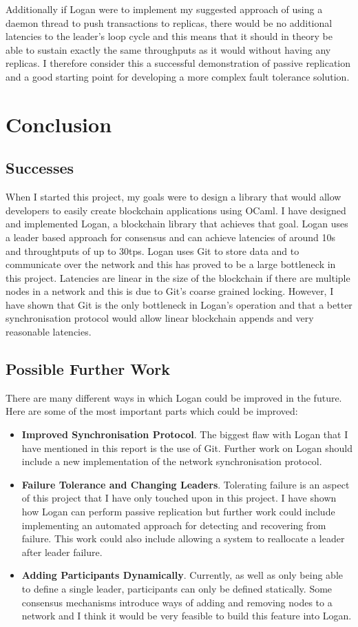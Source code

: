 \documentclass[12pt,a4paper,twoside,openright]{report}
\begin{document}
	Additionally if Logan were to implement my suggested approach of using a daemon thread to push transactions to replicas, there would be no additional latencies to the leader's loop cycle and this means that it should in theory be able to sustain exactly the same throughputs as it would without having any replicas.
	I therefore consider this a successful demonstration of passive replication and a good starting point for developing a more complex fault tolerance solution.

	\chapter{Conclusion}
	\section{Successes}
	When I started this project, my goals were to design a library that would allow developers to easily create blockchain applications using OCaml.
	I have designed and implemented Logan, a blockchain library that achieves that goal.
	Logan uses a leader based approach for consensus and can achieve latencies of around 10s and throughtputs of up to 30tps.
	Logan uses Git to store data and to communicate over the network and this has proved to be a large bottleneck in this project. 
	Latencies are linear in the size of the blockchain if there are multiple nodes in a network and this is due to Git's coarse grained locking.
	However, I have shown that Git is the only bottleneck in Logan's operation and that a better synchronisation protocol would allow linear blockchain appends and very reasonable latencies. 

	\section{Possible Further Work}
	There are many different ways in which Logan could be improved in the future.
	Here are some of the most important parts which could be improved:
	\begin{itemize}
	\item \textbf{Improved Synchronisation Protocol}.
	The biggest flaw with Logan that I have mentioned in this report is the use of Git.
	Further work on Logan should include a new implementation of the network synchronisation protocol.
	\item \textbf{Failure Tolerance and Changing Leaders}.
	Tolerating failure is an aspect of this project that I have only touched upon in this project. 
	I have shown how Logan can perform passive replication but further work could include implementing an automated approach for detecting and recovering from failure. 
	This work could also include allowing a system to reallocate a leader after leader failure.
	\item \textbf{Adding Participants Dynamically}.
	Currently, as well as only being able to define a single leader, participants can only be defined statically. 
	Some consensus mechanisms introduce ways of adding and removing nodes to a network and I think it would be very feasible to build this feature into Logan.
	\end{itemize}
\end{document}
